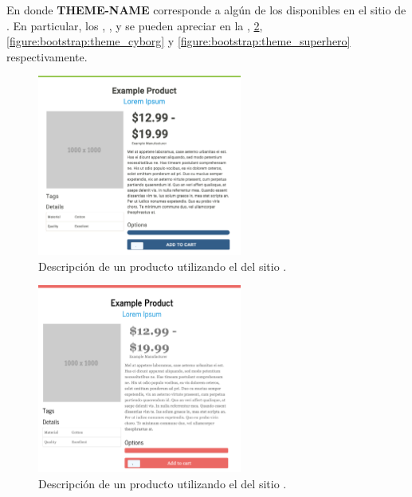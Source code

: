 En donde \textbf{THEME-NAME} corresponde a algún \themeCPT de los disponibles en el sitio de \bootswatchNAME. En particular, los \themesCPT \textbf{\themeSandstone}, \textbf{\themeJournal}, \textbf{\themeCyborg} y \textbf{\themeSuperHero} se pueden apreciar en la , \ref{figure:bootstrap:theme_journal}, \ref{figure:bootstrap:theme_cyborg} y \ref{figure:bootstrap:theme_superhero} respectivamente.


\begin{figure}[H]
	\centering
	\includegraphics[width=0.6\textwidth]{figuras/bootstrap/bootstrap_theme_sandstone.png}

	\caption{Descripción de un producto utilizando el \themeCPT \textbf{\themeSandstone} del sitio \bootswatchNAME.}
	\label{figure:bootstrap:theme_standstone}
\end{figure}

\begin{figure}[H]
	\centering
	\includegraphics[width=0.6\textwidth]{figuras/bootstrap/bootstrap_theme_journal.png}

	\caption{Descripción de un producto utilizando el \themeCPT \textbf{\themeJournal} del sitio \bootswatchNAME.}
	\label{figure:bootstrap:theme_journal}
\end{figure}

